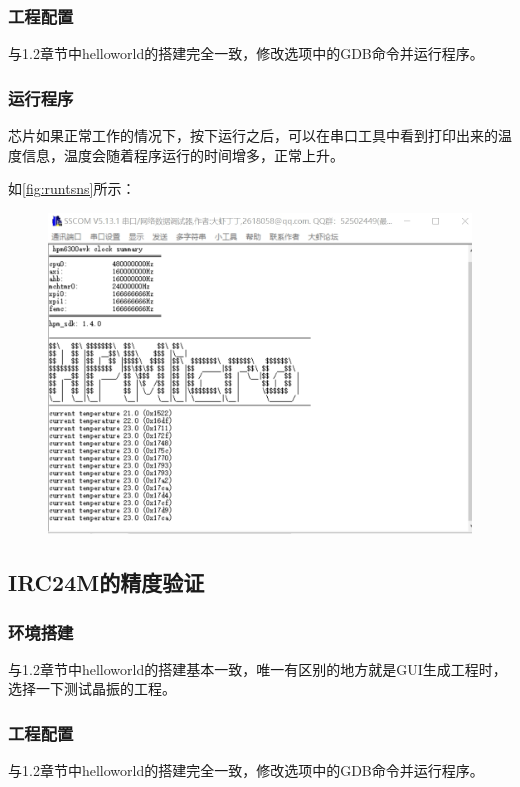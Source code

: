 \subsubsection{工程配置}
与1.2章节中helloworld的搭建完全一致，修改选项中的GDB命令并运行程序。\par

\subsubsection{运行程序}
芯片如果正常工作的情况下，按下运行之后，可以在串口工具中看到打印出来的温度信息，温度会随着程序运行的时间增多，正常上升。\par
如\autoref{fig:runtsns}所示：\par
\vspace{\baselineskip}
\vspace{0.2cm}
\begin{figure}[H]
	\centering
	\includegraphics[width=0.7\linewidth]{img/runtsns.png}
	\caption{}
	\label{fig:runtsns}
\end{figure}
\vspace{\baselineskip}
\vspace{0.3cm} 


\clearpage
\subsection{IRC24M的精度验证}
\subsubsection{环境搭建}
与1.2章节中helloworld的搭建基本一致，唯一有区别的地方就是GUI生成工程时，选择一下测试晶振的工程。\par

\subsubsection{工程配置}
与1.2章节中helloworld的搭建完全一致，修改选项中的GDB命令并运行程序。\par

